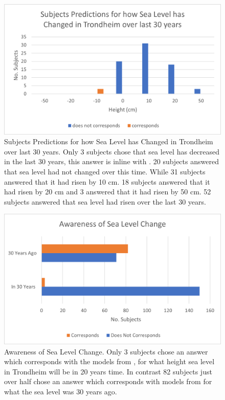 \begin{figure}[H]
    \centering
    \includegraphics{fig_results/slr-past.png}
    \caption{Subjects Predictions for how Sea Level has Changed in Trondheim over last 30 years. Only 3 subjects chose that sea level has decreased in the last 30 years, this answer is inline with \cite{kartverket_se_2021}. 20 subjects answered that sea level had not changed over this time. While 31 subjects answered that it had risen by 10 cm. 18 subjects answered that it had risen by 20 cm and 3 answered that it had risen by 50 cm. 52 subjects answered that sea level had risen over the last 30 years. }
    \label{fig:my_label}
\end{figure}


\begin{figure}[H]
    \centering
    \includegraphics{fig_results/Aware_sea_level_change.png}
    \caption{Awareness of Sea Level Change. Only 3 subjects chose an answer which corresponds with the models from \cite{kartverket_se_2021}, for what height sea level in Trondheim will be in 20 years time. In contrast 82 subjects just over half chose an answer which corresponds with models from \cite{kartverket_se_2021} for what the sea level was 30 years ago. }
    \label{fig:my_label}
\end{figure}
